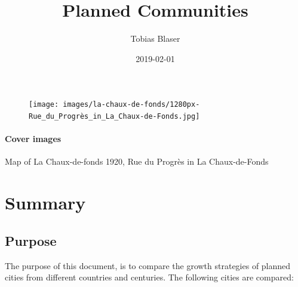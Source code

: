 \documentclass[twocolumn]{article}
\title{Planned Communities}
\date{2019-02-01}
\author{Tobias Blaser}
\begin{document}
	
	
	\maketitle	
 	
	\begin{figure}[b!]
 		\texttt{[image: images/la-chaux-de-fonds/1280px-Rue\_du\_Progrès\_in\_La\_Chaux-de-Fonds.jpg]}
 	\end{figure}
 	
 	\restoregeometry	
	
	
	\clearpage
	
	\begin{strip}
	\tableofcontents
	\paragraph{Cover images}
	Map of La Chaux-de-fonds 1920\cite{MapGeoAdmin:LaChauxDeFonds1920},
	Rue du Progrès in La Chaux-de-Fonds\cite{Wikimedia:RueDuProgressLaChauxDeFonds}
	\end{strip}
	
	\clearpage
	\section{Summary}
		\subsection{Purpose}
		The purpose of this document, is to compare the growth strategies of planned cities from different countries and centuries.
		The following cities are compared:
		
\end{document}

